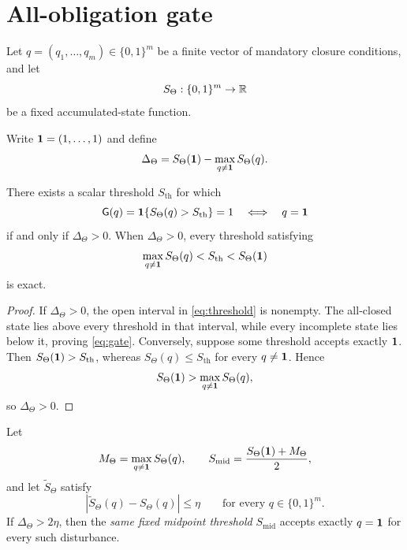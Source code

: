 \section{All-obligation gate}

Let $q=(q_1,\ldots,q_m)\in\{0,1\}^m$ be a finite vector of mandatory closure conditions, and let
\[
S_\Theta:\{0,1\}^m\to\mathbb R
\]
be a fixed accumulated-state function.

\begin{definition}
Write $\mathbf 1=(1,\ldots,1)$ and define
\begin{equation}
\Delta_\Theta=S_\Theta(\mathbf 1)-\max_{q\neq\mathbf 1}S_\Theta(q).
\label{eq:margin}
\end{equation}
\end{definition}

\begin{theorem}
There exists a scalar threshold $S_{\mathrm{th}}$ for which
\begin{equation}
\mathsf G(q)=\mathbf 1\{S_\Theta(q)>S_{\mathrm{th}}\}=1
\quad\Longleftrightarrow\quad q=\mathbf 1
\label{eq:gate}
\end{equation}
if and only if $\Delta_\Theta>0$. When $\Delta_\Theta>0$, every threshold satisfying
\begin{equation}
\max_{q\neq\mathbf 1}S_\Theta(q)<S_{\mathrm{th}}<S_\Theta(\mathbf 1)
\label{eq:threshold}
\end{equation}
is exact.
\end{theorem}

\begin{proof}
If $\Delta_\Theta>0$, the open interval in \cref{eq:threshold} is nonempty. The all-closed state lies above every threshold in that interval, while every incomplete state lies below it, proving \cref{eq:gate}. Conversely, suppose some threshold accepts exactly $\mathbf 1$. Then $S_\Theta(\mathbf 1)>S_{\mathrm{th}}$, whereas $S_\Theta(q)\le S_{\mathrm{th}}$ for every $q\neq\mathbf 1$. Hence
\[
S_\Theta(\mathbf 1)>\max_{q\neq\mathbf 1}S_\Theta(q),
\]
so $\Delta_\Theta>0$.
\end{proof}

\begin{theorem}
Let
\[
M_\Theta=\max_{q\neq\mathbf 1}S_\Theta(q),
\qquad
S_{\mathrm{mid}}=\frac{S_\Theta(\mathbf 1)+M_\Theta}{2},
\]
and let $\widetilde S_\Theta$ satisfy
\begin{equation}
|\widetilde S_\Theta(q)-S_\Theta(q)|\le\eta
\qquad\text{for every }q\in\{0,1\}^m.
\label{eq:disturbance}
\end{equation}
If $\Delta_\Theta>2\eta$, then the \emph{same fixed midpoint threshold} $S_{\mathrm{mid}}$ accepts exactly $q=\mathbf 1$ for every such disturbance.
\end{theorem}

